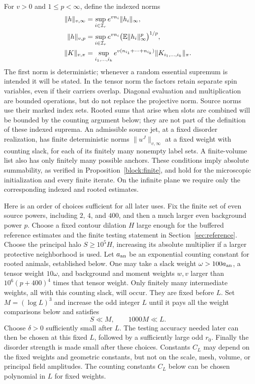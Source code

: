 For $v>0$ and $1\le p<\infty$, define the indexed norms
\begin{align}
 \|h\|_{v,\infty}
   &=\sup_{i\in\mathcal I_r}e^{vn_i}\|h_i\|_\infty,
 \label{block:det-indexed}\\
 \|h\|_{v,p}
   &=\sup_{i\in\mathcal I_r}e^{vn_i}
                      \bigl(\mathbb E\|h_i\|_\infty^p\bigr)^{1/p},
 \label{block:indexed}\\
 \|K\|_{v,\pi}
   &=\sup_{i_1,\ldots,i_k}
          e^{v(n_{i_1}+\cdots+n_{i_k})}
                       \|K_{i_1,\ldots,i_k}\|_\pi.
 \label{block:tensor-indexed}
\end{align}
The first norm is deterministic; whenever a random essential supremum
is intended it will be stated.  In the tensor norm the factors retain
separate spin variables, even if their carriers overlap.  Diagonal
evaluation and multiplication are bounded operations, but do not replace
the projective norm.  Source norms use their marked index sets.  Rooted
sums that arise when slots are combined will be bounded by the counting
argument below; they are not part of the definition of these indexed
suprema.  An admissible source jet, at a fixed disorder realization,
has finite deterministic norms $\|u^J\|_{v,\infty}$ at a fixed weight
with counting slack, for each of its finitely many nonempty label sets.  A finite-volume list
also has only finitely many possible anchors.  These conditions imply
absolute summability, as verified in Proposition~\ref{block:finite},
and hold for the microscopic initialization and every finite iterate.
On the infinite plane we require only the corresponding indexed and
rooted estimates.

Here is an order of choices sufficient for all later uses.  Fix the
finite set of even source powers, including $2$, $4$, and $400$, and
then a much larger even background power $p$.  Choose a fixed contour
dilation $H$ large enough for the buffered reference estimates and the
finite testing statement in Section~\ref{sec:reference}.  Choose the
principal halo $S\ge 10^5H$, increasing its absolute multiplier if a
larger protective neighborhood is used.  Let $a_{\rm an}$ be an
exponential counting constant for rooted animals, established below.
One may take a slack weight $\omega>100a_{\rm an}$, a tensor weight
$10\omega$, and background and moment weights $w,v$ larger than
$10^6(p+400)^4$ times that tensor weight.  Only finitely many intermediate
weights, all with this counting slack, will occur.  They are fixed before
$L$.  Set $M=(\log L)^3$ and increase the odd integer $L$ until it pays
all the weight comparisons below and satisfies
\begin{equation}
 S\ll M,\qquad 1000M\ll L.
 \label{block:M}
\end{equation}
Choose $\delta>0$ sufficiently small after $L$.  The testing accuracy
needed later can then be chosen at this fixed $L$, followed by a
sufficiently large odd $r_0$.  Finally the disorder strength is made
small after these choices.  Constants $C_L$ may depend on the fixed
weights and geometric constants, but not on the scale, mesh, volume,
or principal field amplitudes.  The counting constants $C_L$ below can
be chosen polynomial in $L$ for fixed weights.

